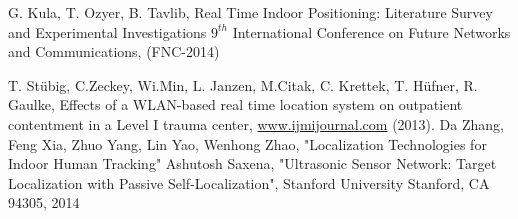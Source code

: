 \begin{thebibliography}{99}
			G. Kula, T. Ozyer, B. Tavlib, 
			Real Time Indoor Positioning: Literature Survey and Experimental Investigations
			$9^{th}$ International Conference on Future Networks and Communications,
			(FNC-2014)

			T. Stübig, C.Zeckey, Wi.Min, L. Janzen, M.Citak, C. Krettek, T. Hüfner, R. Gaulke, 
			Effects of a WLAN-based real time location system on outpatient contentment in a Level I trauma center,
			\url{www.ijmijournal.com}
			(2013).
			Da Zhang, Feng Xia, Zhuo Yang, Lin Yao, Wenhong Zhao,			"Localization Technologies for Indoor Human Tracking"
		\bibitem{}
			Ashutosh Saxena,
			"Ultrasonic Sensor Network: Target Localization with Passive Self-Localization",
			Stanford University Stanford, CA 94305,
			2014
	\end{thebibliography}